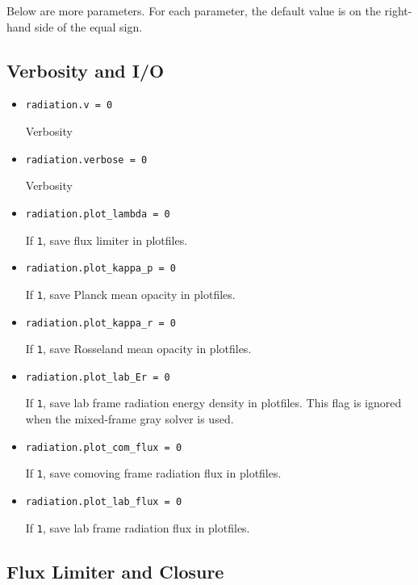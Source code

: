 Below are more parameters.  For each parameter, the default value is
on the right-hand side of the equal sign.


\subsection{Verbosity and I/O}
\label{sec:bothpar}

\begin{itemize}
\item {\tt radiation.v = 0}
  
  Verbosity

\item {\tt radiation.verbose = 0}
  
  Verbosity

\item {\tt radiation.plot\_lambda = 0}
  
  If {\tt 1}, save flux limiter in plotfiles.

\item {\tt radiation.plot\_kappa\_p = 0}

  If {\tt 1}, save Planck mean opacity in plotfiles.

\item {\tt radiation.plot\_kappa\_r = 0}

  If {\tt 1}, save Rosseland mean opacity in plotfiles.

\item {\tt radiation.plot\_lab\_Er = 0}
  
  If {\tt 1}, save lab frame radiation energy density in plotfiles.
  This flag is ignored when the mixed-frame gray solver is used.

\item {\tt radiation.plot\_com\_flux = 0}
  
  If {\tt 1}, save comoving frame radiation flux in plotfiles.

\item {\tt radiation.plot\_lab\_flux = 0}

  If {\tt 1}, save lab frame radiation flux in plotfiles.

\end{itemize}


\subsection{Flux Limiter and Closure}

\label{sec:fluxlimiter}

